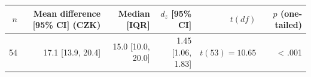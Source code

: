 \begin{tabular}{rrrrrr}
\toprule
$n$ & Mean difference [95\% CI] (CZK) & Median [IQR] & $d_z$ [95\% CI] & $t(df)$ & $p$ (one-tailed) \\
\midrule
54 & 17.1 [13.9, 20.4] & 15.0 [10.0, 20.0] & 1.45 [1.06, 1.83] & $t(53) = 10.65$ & < .001 \\
\bottomrule
\end{tabular}
